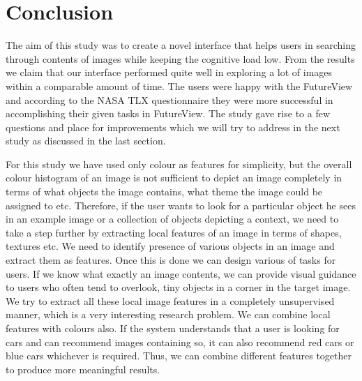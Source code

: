 \documentclass[english]{tktltiki}
\begin{document}
\section{Conclusion}

The aim of this study was to create a novel interface that helps users in searching through contents of images while keeping the cognitive load low. From the results we claim that our interface performed quite well in exploring a lot of images within a comparable amount of time. The users were happy with the FutureView and according to the NASA TLX questionnaire they were more successful in accomplishing their given tasks in FutureView. The study gave rise to a few questions and place for improvements which we will try to address in the next study as discussed in the last section.

For this study we have used only colour as features for simplicity, but the overall colour histogram of an image is not sufficient to depict an image completely in terms of what objects the image contains, what theme the image could be assigned to etc. Therefore, if the user wants to look for a particular object he sees in an example image or a collection of objects depicting a context, we need to take a step further by extracting local features of an image in terms of shapes, textures etc. We need to identify presence of various objects in an image and extract them as features. Once this is done we can design various of tasks for users. If we know what exactly an image contents, we can provide visual guidance to users who often tend to overlook, tiny objects in a corner in the target image. We try to extract all these local image features in a completely unsupervised manner, which is a very interesting research problem. We can combine local features with colours also. If the system understands that a user is looking for cars and can recommend images containing so, it can also recommend red cars or blue cars whichever is required. Thus, we can combine different features together to produce more meaningful results.


\end{document}
